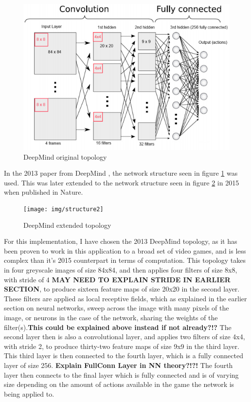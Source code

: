 \documentclass[10pt]{article}
\begin{document}
		\begin{figure}[h]				
			\includegraphics[scale=0.7]{img/structure}
			\centering
			\caption{DeepMind original topology \cite{repli}}
			\label{fig:topology13}
		\end{figure}
		
		In the 2013 paper from DeepMind \cite{ataridrl}, the network structure seen in figure \ref{fig:topology13} was used. This was later extended to the network structure seen in figure \ref{fig:topology15} in 2015 when published in Nature.\\
		
		\begin{figure}[h]				
			\texttt{[image: img/structure2]}
			\centering
			\caption{DeepMind extended topology}
			\label{fig:topology15}
		\end{figure}
		
		For this implementation, I have chosen the 2013 DeepMind topology, as it has been proven to work in this application to a broad set of video games, and is less complex than it's 2015 counterpart in terms of computation. This topology takes in four greyscale images of size 84x84, and then applies four filters of size 8x8, with stride of 4 \textbf{MAY NEED TO EXPLAIN STRIDE IN EARLIER SECTION}, to produce sixteen feature maps of size 20x20 in the second layer. These filters are applied as local receptive fields, which as explained in the earlier section on neural networks, sweep across the image with many pixels of the image, or neurons in the case of the network, sharing the weights of the filter(s).\textbf{This could be explained above instead if not already?!?} The second layer then is also a convolutional layer, and applies two filters of size 4x4, with stride 2, to produce thirty-two feature maps of size 9x9 in the third layer. This third layer is then connected to the fourth layer, which is a fully connected layer of size 256. \textbf{Explain FullConn Layer in NN theory?!?!} The fourth layer then connects to the final layer which is fully connected and is of varying size depending on the amount of actions available in the game the network is being applied to.\\
		
\end{document}
